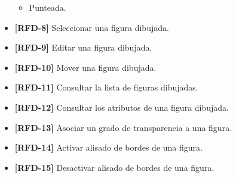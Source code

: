 \begin{itemize}
\begin{itemize}
\item{Punteada.}
\end{itemize}
\item{\textbf{[RFD-8]} Seleccionar una figura dibujada.}
\item{\textbf{[RFD-9]} Editar una figura dibujada.}
\item{\textbf{[RFD-10]} Mover una figura dibujada.}
\item{\textbf{[RFD-11]} Consultar la lista de figuras dibujadas.}
\item{\textbf{[RFD-12]} Consultar los atributos de una figura dibujada.}
\item{\textbf{[RFD-13]} Asociar un grado de transparencia a una figura.}
\item{\textbf{[RFD-14]} Activar alisado de bordes de una figura.}
\item{\textbf{[RFD-15]} Desactivar alisado de bordes de una figura.}
\end{itemize}
